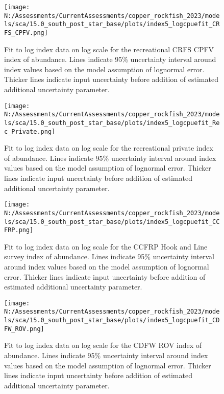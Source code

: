 \documentclass[11pt,
  english,
  letterpaper,
]{article}
\begin{document}
\pagebreak

\begin{figure}
\centering
\texttt{[image: N:/Assessments/CurrentAssessments/copper\_rockfish\_2023/models/sca/15.0\_south\_post\_star\_base/plots/index5\_logcpuefit\_CRFS\_CPFV.png]}
\caption{Fit to log index data on log scale for the recreational CRFS CPFV index of abundance. Lines indicate 95\% uncertainty interval around index values based on the model assumption of lognormal error. Thicker lines indicate input uncertainty before addition of estimated additional uncertainty parameter.\label{fig:crfs-cpfv-index-fit}}
\end{figure}

\pagebreak

\begin{figure}
\centering
\texttt{[image: N:/Assessments/CurrentAssessments/copper\_rockfish\_2023/models/sca/15.0\_south\_post\_star\_base/plots/index5\_logcpuefit\_Rec\_Private.png]}
\caption{Fit to log index data on log scale for the recreational private index of abundance. Lines indicate 95\% uncertainty interval around index values based on the model assumption of lognormal error. Thicker lines indicate input uncertainty before addition of estimated additional uncertainty parameter.\label{fig:crfs-pr-index-fit}}
\end{figure}

\pagebreak

\begin{figure}
\centering
\texttt{[image: N:/Assessments/CurrentAssessments/copper\_rockfish\_2023/models/sca/15.0\_south\_post\_star\_base/plots/index5\_logcpuefit\_CCFRP.png]}
\caption{Fit to log index data on log scale for the CCFRP Hook and Line survey index of abundance. Lines indicate 95\% uncertainty interval around index values based on the model assumption of lognormal error. Thicker lines indicate input uncertainty before addition of estimated additional uncertainty parameter.\label{fig:ccfrp-index-fit}}
\end{figure}

\pagebreak

\begin{figure}
\centering
\texttt{[image: N:/Assessments/CurrentAssessments/copper\_rockfish\_2023/models/sca/15.0\_south\_post\_star\_base/plots/index5\_logcpuefit\_CDFW\_ROV.png]}
\caption{Fit to log index data on log scale for the CDFW ROV index of abundance. Lines indicate 95\% uncertainty interval around index values based on the model assumption of lognormal error. Thicker lines indicate input uncertainty before addition of estimated additional uncertainty parameter.\label{fig:rov-index-fit}}
\end{figure}
\end{document}
